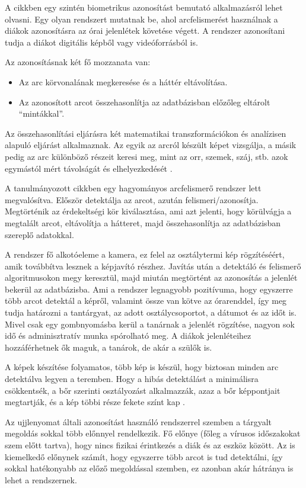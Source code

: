 A \cite{7} cikkben egy szintén biometrikus azonosítást bemutató alkalmazásról lehet olvasni. Egy olyan rendszert mutatnak be, ahol arcfelismerést használnak a diákok azonosításra az órai jelenlétek követése végett. A rendszer azonosítani tudja a diákot digitális képből vagy videóforrásból is.

Az azonosításnak két fő mozzanata van:
\begin{itemize}
			\item Az arc körvonalának megkeresése és a háttér eltávolítása.
			\item Az azonosított arcot összehasonlítja az adatbázisban előzőleg eltárolt \enquote{mintákkal}. 
\end{itemize}
Az összehasonlítási eljárásra két matematikai transzformációkon és analízisen alapuló eljárást alkalmaznak. Az egyik az arcról készült képet vizsgálja, a másik pedig az arc különböző részeit keresi meg, mint az orr, szemek, száj, stb. azok egymástól mért távolságát és elhelyezkedését \cite{6}.

A tanulmányozott cikkben egy hagyományos arcfelismerő rendszer lett megvalósítva. Először detektálja az arcot, azután felismeri/azonosítja.
Megtörténik az érdekeltségi kör kiválasztása, ami azt jelenti, hogy körülvágja a megtalált arcot, eltávolítja a hátteret, majd összehasonlítja az adatbázisban szereplő adatokkal. 

A rendszer fő alkotóeleme a kamera, ez felel az osztálytermi kép rögzítéséért, amik továbbítva lesznek a képjavító részhez. Javítás után a detektáló és felismerő algoritmusokon megy keresztül, majd miután megtörtént az azonosítás a jelenlét bekerül az adatbázisba. Ami a rendszer legnagyobb pozitívuma, hogy egyszerre több arcot detektál a képről, valamint össze van kötve az órarenddel, így meg tudja határozni a tantárgyat, az adott osztálycsoportot, a dátumot és az időt is.
Mivel csak egy gombnyomásba kerül a tanárnak a jelenlét rögzítése, nagyon sok idő és adminisztratív munka spórolható meg. A diákok jelenléteihez hozzáférhetnek ők maguk, a tanárok, de akár a szülők is.

A képek készítése folyamatos, több kép is készül, hogy biztosan minden arc detektálva legyen a teremben.
Hogy a hibás detektálást a minimálisra csökkentsék, a bőr szerinti osztályozást alkalmazzák, azaz a bőr képpontjait megtartják, és a kép többi része fekete színt kap \cite{7}. 

Az ujjlenyomat általi azonosítást használó rendszerrel szemben a tárgyalt megoldás sokkal több előnnyel rendelkezik. Fő előnye (főleg a vírusos időszakokat szem előtt tartva), hogy nincs fizikai érintkezés a diák és az eszköz között. Az is kiemelkedő előnynek számít, hogy egyszerre több arcot is tud detektálni, így sokkal hatékonyabb az előző megoldással szemben, ez azonban akár hátránya is lehet a rendszernek.

